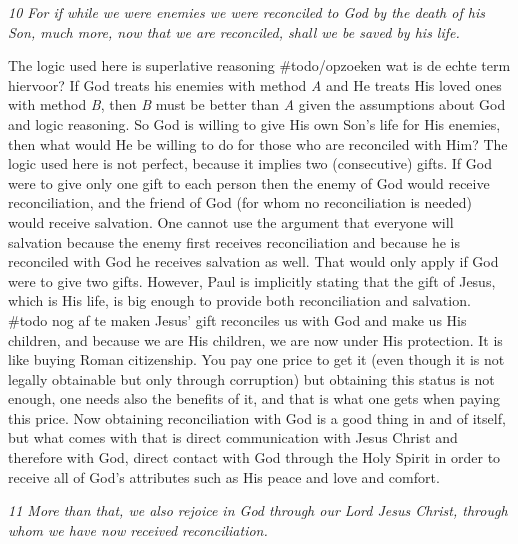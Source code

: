 \emph{10 For if while we were enemies we were reconciled to God by the
death of his Son, much more, now that we are reconciled, shall we be
saved by his life.}

The logic used here is superlative reasoning \#todo/opzoeken wat is de
echte term hiervoor? If God treats his enemies with method \emph{A} and
He treats His loved ones with method \emph{B}, then \emph{B} must be
better than \emph{A} given the assumptions about God and logic
reasoning. So God is willing to give His own Son's life for His enemies,
then what would He be willing to do for those who are reconciled with
Him? The logic used here is not perfect, because it implies two
(consecutive) gifts. If God were to give only one gift to each person
then the enemy of God would receive reconciliation, and the friend of
God (for whom no reconciliation is needed) would receive salvation. One
cannot use the argument that everyone will salvation because the enemy
first receives reconciliation and because he is reconciled with God he
receives salvation as well. That would only apply if God were to give
two gifts. However, Paul is implicitly stating that the gift of Jesus,
which is His life, is big enough to provide both reconciliation and
salvation. \#todo nog af te maken Jesus' gift reconciles us with God and
make us His children, and because we are His children, we are now under
His protection. It is like buying Roman citizenship. You pay one price
to get it (even though it is not legally obtainable but only through
corruption) but obtaining this status is not enough, one needs also the
benefits of it, and that is what one gets when paying this price. Now
obtaining reconciliation with God is a good thing in and of itself, but
what comes with that is direct communication with Jesus Christ and
therefore with God, direct contact with God through the Holy Spirit in
order to receive all of God's attributes such as His peace and love and
comfort.

\emph{11 More than that, we also rejoice in God through our Lord Jesus
Christ, through whom we have now received reconciliation.}

